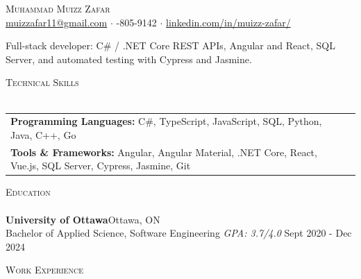 \documentclass[a4paper]{article}
\newcommand{\header} [1] {
    {\hspace*{-18pt}\vspace*{6pt} \textsc{#1}}
    \vspace*{-6pt} \\
    \hspace*{-18pt} \hrulefill \\
}
\begin{document}
\vspace*{-40pt}

\vspace*{-10pt}
\begin{center}
	{\Huge \scshape {Muhammad Muizz Zafar}}\\
\faSend \space \href{mailto:muizzafar11@gmail.com}{muizzafar11@gmail.com} $\cdot$ \faPhoneSquare {}-805-9142 $\cdot$ \faLinkedinSquare \space \href{https://www.linkedin.com/in/muizz-zafar/}{linkedin.com/in/muizz-zafar/}
	\\
\end{center}
\begin{center}
Full-stack developer: C\# / .NET Core REST APIs, Angular and React, SQL Server, and automated testing with Cypress and Jasmine.
\end{center}

\header{Technical Skills}
\begin{tabular}{ l l }
\textbf{Programming Languages:} C\#, TypeScript, JavaScript, SQL, Python, Java, C++, Go \\
\textbf{Tools \& Frameworks:} Angular, Angular Material, .NET Core, React, Vue.js, SQL Server, Cypress, Jasmine, Git
\end{tabular}
\vspace{4mm}

\header{Education}
\textbf{University of Ottawa}\hfill Ottawa, ON\\
Bachelor of Applied Science, Software Engineering \textit{GPA: 3.7/4.0} \hfill Sept 2020 - Dec 2024\\
\vspace{4mm}

\header{Work Experience}
\end{document}
